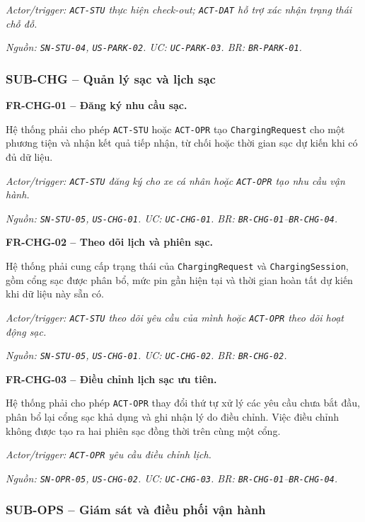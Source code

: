 \textit{Actor/trigger: \texttt{ACT-STU} thực hiện check-out; \texttt{ACT-DAT} hỗ trợ xác nhận trạng thái chỗ đỗ.}\par
\textit{Nguồn: \texttt{SN-STU-04}, \texttt{US-PARK-02}. UC: \texttt{UC-PARK-03}. BR: \texttt{BR-PARK-01}.}

\subsubsection{SUB-CHG -- Quản lý sạc và lịch sạc}

\noindent\textbf{FR-CHG-01 -- Đăng ký nhu cầu sạc.}\par
\nopagebreak[4]
Hệ thống phải cho phép \texttt{ACT-STU} hoặc \texttt{ACT-OPR} tạo \texttt{ChargingRequest} cho một phương tiện và nhận kết quả tiếp nhận, từ chối hoặc thời gian sạc dự kiến khi có đủ dữ liệu.

\textit{Actor/trigger: \texttt{ACT-STU} đăng ký cho xe cá nhân hoặc \texttt{ACT-OPR} tạo nhu cầu vận hành.}\par
\textit{Nguồn: \texttt{SN-STU-05}, \texttt{US-CHG-01}. UC: \texttt{UC-CHG-01}. BR: \texttt{BR-CHG-01}--\texttt{BR-CHG-04}.}

\medskip
\noindent\textbf{FR-CHG-02 -- Theo dõi lịch và phiên sạc.}\par
\nopagebreak[4]
Hệ thống phải cung cấp trạng thái của \texttt{ChargingRequest} và \texttt{ChargingSession}, gồm cổng sạc được phân bổ, mức pin gần hiện tại và thời gian hoàn tất dự kiến khi dữ liệu này sẵn có.

\textit{Actor/trigger: \texttt{ACT-STU} theo dõi yêu cầu của mình hoặc \texttt{ACT-OPR} theo dõi hoạt động sạc.}\par
\textit{Nguồn: \texttt{SN-STU-05}, \texttt{US-CHG-01}. UC: \texttt{UC-CHG-02}. BR: \texttt{BR-CHG-02}.}

\medskip
\noindent\textbf{FR-CHG-03 -- Điều chỉnh lịch sạc ưu tiên.}\par
\nopagebreak[4]
Hệ thống phải cho phép \texttt{ACT-OPR} thay đổi thứ tự xử lý các yêu cầu chưa bắt đầu, phân bổ lại cổng sạc khả dụng và ghi nhận lý do điều chỉnh. Việc điều chỉnh không được tạo ra hai phiên sạc đồng thời trên cùng một cổng.

\textit{Actor/trigger: \texttt{ACT-OPR} yêu cầu điều chỉnh lịch.}\par
\textit{Nguồn: \texttt{SN-OPR-05}, \texttt{US-CHG-02}. UC: \texttt{UC-CHG-03}. BR: \texttt{BR-CHG-01}--\texttt{BR-CHG-04}.}

\subsubsection{SUB-OPS -- Giám sát và điều phối vận hành}


